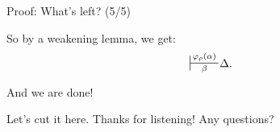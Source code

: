 \documentclass[10pt]{beamer}
\newcommand{\sintcons}[2]{\;\sststile{#2}{#1}\!}
\begin{document}
\begin{frame}{Proof: What's left? (5/5)}

\pause


So by a weakening lemma, we get:
$$\sintcons{\varphi_\rho(\alpha)}{\beta} \Delta.$$

And we are done!

\end{frame}

\begin{frame}{Let's cut it here.}
    Thanks for listening! Any questions?
\end{frame}

\iffalse
\begin{frame}{End}
Thanks! Questions? \bigskip \bigskip
\texttt{[image: alan.jpg]}
\indent\ If Alan was alive, he'd be so happy about gay marriage appearing worldwide that he would buy \color{orange}Tu\color{blue}rings\color{black}!
\texttt{[image: tu.png]}
Right? Right?! ... We'll see ouserlves out.
\end{frame}
\fi
\end{document}
